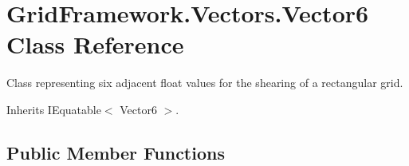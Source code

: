 \hypertarget{class_grid_framework_1_1_vectors_1_1_vector6}{\section{Grid\+Framework.\+Vectors.\+Vector6 Class Reference}
\label{class_grid_framework_1_1_vectors_1_1_vector6}
}


Class representing six adjacent float values for the shearing of a rectangular grid. 




Inherits I\+Equatable$<$ Vector6 $>$.

\subsection*{Public Member Functions}
